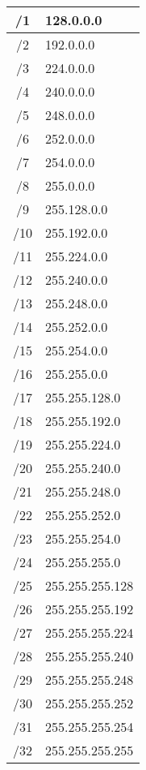 \documentclass[a4paper,8pt]{extarticle}
\begin{document}
\begin{multicols}{4}
\begin{center}
\begin{tabular}{|c|l|}
	\hline
	/1	& 128.0.0.0       \\ \hline
	/2	& 192.0.0.0       \\ \hline
	/3	& 224.0.0.0       \\ \hline
	/4	& 240.0.0.0       \\ \hline
	/5	& 248.0.0.0       \\ \hline
	/6	& 252.0.0.0       \\ \hline
	/7	& 254.0.0.0       \\ \hline
	/8	& 255.0.0.0       \\ \hline
	/9	& 255.128.0.0     \\ \hline
	/10	& 255.192.0.0     \\ \hline
	/11	& 255.224.0.0     \\ \hline
	/12	& 255.240.0.0     \\ \hline
	/13	& 255.248.0.0     \\ \hline
	/14	& 255.252.0.0     \\ \hline
	/15	& 255.254.0.0     \\ \hline
	/16	& 255.255.0.0     \\ \hline
	/17	& 255.255.128.0   \\ \hline
	/18	& 255.255.192.0   \\ \hline
	/19	& 255.255.224.0   \\ \hline
	/20	& 255.255.240.0   \\ \hline
	/21	& 255.255.248.0   \\ \hline
	/22	& 255.255.252.0   \\ \hline
	/23	& 255.255.254.0   \\ \hline
	/24	& 255.255.255.0   \\ \hline
	/25	& 255.255.255.128 \\ \hline
	/26	& 255.255.255.192 \\ \hline
	/27	& 255.255.255.224 \\ \hline
	/28	& 255.255.255.240 \\ \hline
	/29	& 255.255.255.248 \\ \hline
	/30	& 255.255.255.252 \\ \hline
	/31	& 255.255.255.254 \\ \hline
	/32	& 255.255.255.255  \\ \hline
\end{tabular}
\end{center}

\end{multicols}
\end{document}
